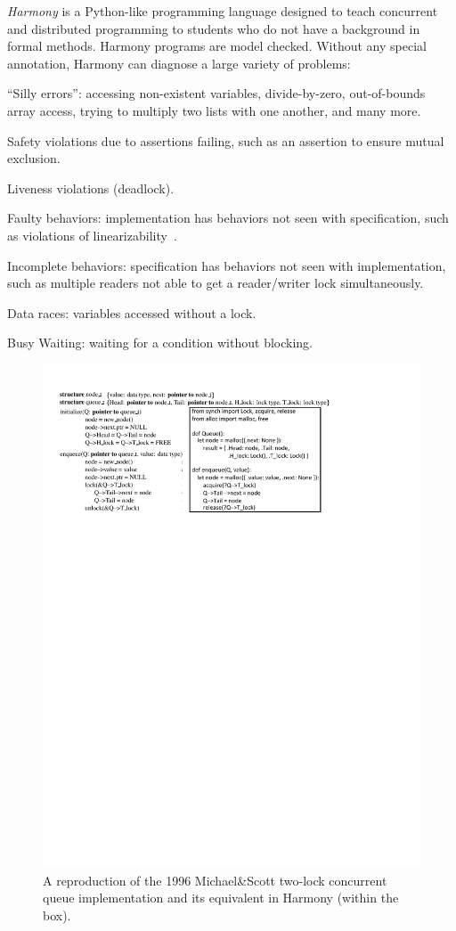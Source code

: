 \documentclass[twocolumn]{article}
\begin{document}
\emph{Harmony} is a Python-like programming language designed to teach
concurrent and distributed programming to students who do not have a
background in formal methods.  Harmony programs are model checked.
Without any special annotation, Harmony can diagnose a large variety
of problems:
\begin{compactitem}
\item ``Silly errors'': accessing non-existent variables,
divide-by-zero, out-of-bounds array access, trying to multiply two lists
with one another, and many more.
\item Safety violations due to assertions failing, such as an assertion to ensure mutual exclusion.
\item Liveness violations (deadlock).
\item Faulty behaviors: implementation has behaviors not seen with specification, such as violations of linearizability~\cite{HW90}.
\item Incomplete behaviors: specification has behaviors not seen with implementation, such as multiple readers not able to get a reader/writer lock simultaneously.
\item Data races: variables accessed without a lock.
\item Busy Waiting: waiting for a condition without blocking.
\end{compactitem}

\begin{figure}
\begin{center}
\includegraphics[width=.9\textwidth]{MS.pdf}
\end{center}
\caption{A reproduction of the 1996 Michael\&Scott two-lock concurrent queue
implementation and its equivalent in Harmony (within the box).}
\label{fig:ms}
\end{figure}
\end{document}
